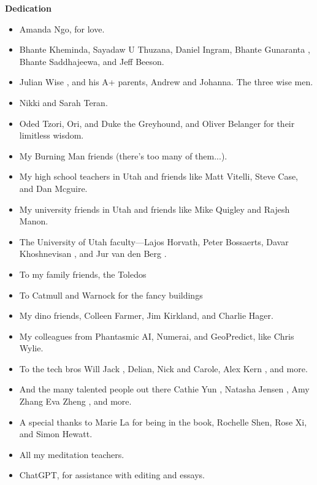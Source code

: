 \begin{titlepage}
    \centering
    {\Huge \bfseries Dedication}\par
    \vspace{2cm}
    \begin{itemize}
        \item Amanda Ngo, for love. \cite{gafori} \cite{bradway} \cite{green}
        \item Bhante Kheminda, Sayadaw U Thuzana, Daniel Ingram, Bhante Gunaranta \cite{guna} \cite{bhavana}, Bhante Saddhajeewa, and Jeff Beeson.
        \item Julian Wise \cite{yale}, and his A+ parents, Andrew and Johanna. The three wise men.
        \item Nikki and Sarah Teran.
        \item Oded Tzori, Ori, and Duke the Greyhound, and Oliver Belanger for their limitless wisdom.
        \item My Burning Man friends (there's too many of them...).
        \item My high school teachers in Utah and friends like Matt Vitelli, Steve Case, and Dan Mcguire.
        \item My university friends in Utah and friends like Mike Quigley and Rajesh Manon.
        \item The University of Utah faculty—Lajos Horvath, Peter Bossaerts, Davar Khoshnevisan \cite{davar}, and Jur van den Berg \cite{utah}.
        \item To my family friends, the Toledos
        \item To Catmull and Warnock for the fancy buildings \cite{utah}
        \item My dino friends, Colleen Farmer, Jim Kirkland, and Charlie Hager.
        \item My colleagues from Phantasmic AI, Numerai, and GeoPredict, like Chris Wylie.
        \item To the tech bros Will Jack \cite{mit}, Delian, Nick and Carole, Alex Kern \cite{berkeley}, and more.
        \item And the many talented people out there Cathie Yun \cite{mit}, Natasha Jensen \cite{mit}, Amy Zhang \cite{mit} Eva Zheng \cite{berkeley}, and more.
        \item A special thanks to Marie La for being in the book, Rochelle Shen, Rose Xi, and Simon Hewatt.
        \item All my meditation teachers.
        \item ChatGPT, for assistance with editing and essays.

\end{itemize}
\end{titlepage}
